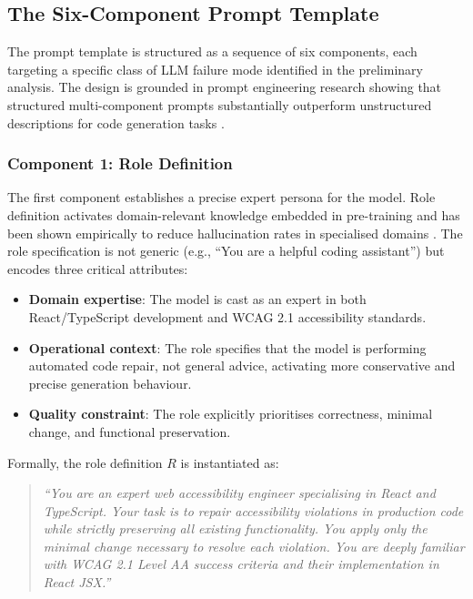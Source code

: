 \subsection{The Six-Component Prompt Template}

The prompt template is structured as a sequence of six components, each
targeting a specific class of LLM failure mode identified in the preliminary
analysis.  The design is grounded in prompt engineering research showing that
structured multi-component prompts substantially outperform unstructured
descriptions for code generation tasks \cite{brown2020,wei2022}.

\subsubsection{Component 1: Role Definition}

The first component establishes a precise expert persona for the model.
Role definition activates domain-relevant knowledge embedded in pre-training
\cite{wei2022} and has been shown empirically to reduce hallucination rates
in specialised domains \cite{white2023prompt}.  The role specification is
not generic (e.g., ``You are a helpful coding assistant'') but encodes three
critical attributes:

\begin{itemize}
  \item \textbf{Domain expertise}: The model is cast as an expert in both
    React/TypeScript development and WCAG 2.1 accessibility standards.
  \item \textbf{Operational context}: The role specifies that the model is
    performing automated code repair, not general advice, activating more
    conservative and precise generation behaviour.
  \item \textbf{Quality constraint}: The role explicitly prioritises
    correctness, minimal change, and functional preservation.
\end{itemize}

\noindent
Formally, the role definition $R$ is instantiated as:

\begin{quote}
  \textit{``You are an expert web accessibility engineer specialising in
  React and TypeScript.  Your task is to repair accessibility violations
  in production code while strictly preserving all existing functionality.
  You apply only the minimal change necessary to resolve each violation.
  You are deeply familiar with WCAG 2.1 Level AA success criteria and their
  implementation in React JSX.''}
\end{quote}


